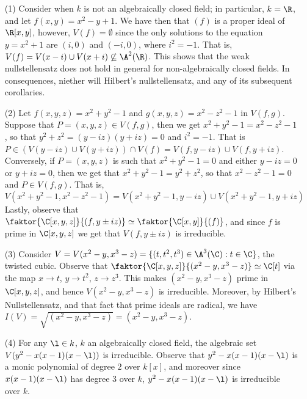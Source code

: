\begin{example}\label{example_1.6}
  \begin{enumerate}
    \item[(1)] Consider when $k$ is not an algebraically closed field; in
      particular,  $k=\R$, and let  $f(x,y)=x^2-y+1$. We have then that $(f)$ is
      a proper ideal of $\R[x,y]$, however, $V(f)=\emptyset$ since the only
      solutions to the equation $y=x^2+1$ are $(i,0)$ and $(-i,0)$, where
      $i^2=-1$. That is, $V(f)=V(x-i) \cup V(x+i) \not\subseteq \A^2(\R)$. This
      shows that  the weak nullstellensatz does not hold in general for
      non-algebraically closed fields. In consequences, niether will Hilbert's
      nullstellensatz, and any of its subsequent corollaries.

    \item[(2)] Let $f(x,y,z)=x^2+y^2-1$ and $g(x,y,z)=x^2-z^2-1$ in $V(f,g)$.
      Suppose that $P=(x,y,z) \in V(f,g)$, then we get $x^2+y^2-1=x^2-z^2-1$, so
      that  $y^2+z^2=(y-iz)(y+iz)=0$ and $i^2=-1$. That is  $P \in (V(y-iz) \cup
      V(y+iz)) \cap V(f)=V(f,y-iz) \cup V(f,y+iz)$. Conversely, if $P=(x,y,z)$
      is such that $x^2+y^2-1=0$ and either  $y-iz=0$ or $y+iz=0$, then we get
      that  $x^2+y^2-1=y^2+z^2$, so that $x^2-z^2-1=0$ and  $P \in V(f,g)$. That
      is,
      \begin{equation*}
        V(x^2+y^2-1,x^2-z^2-1)=V(x^2+y^2-1,y-iz) \cup V(x^2+y^2-1,y+iz)
      \end{equation*}
      Lastly, observe that $\faktor{\C[x,y,z]}{(f,y\pm{iz})} \simeq
      \faktor{\C[x,y]}{(f)}$, and since $f$ is prime in $\C[x,y,z]$ we get
      that $V(f,y\pm{iz})$ is irreducible.

    \item[(3)] Consider $V=V(x^2-y,x^3-z)=\{(t,t^2,t^3) \in \A^3(\C) : t \in
      \C\}$, the twisted cubic. Observe that $\faktor{\C[x,y,z]}{(x^2-y,x^3-z)}
      \simeq \C[t]$ via the map $x \xrightarrow{} t$, $y \xrightarrow{} t^2$, $z
      \xrightarrow{} z^3$. This makes $(x^2-y,x^3-z)$ prime in $\C[x,y,z]$, and
      hence $V(x^2-y,x^3-z)$ is irreducible. Moreover, by Hilbert's
      Nullstellensatz, and that fact that prime ideals are radical, we have
      $I(V)=\sqrt{(x^2-y,x^3-z)}=(x^2-y,x^3-z)$.

    \item[(4)] For any $\l \in k$, $k$ an algebraically closed field, the
      algebraic set $V(y^2-x(x-1)(x-\l))$ is irreducible. Observe that
      $y^2-x(x-1)(x-\l)$ is a monic polynomial of degree $2$ over $k[x]$, and
      moreover since $x(x-1)(x-\l)$ has degree $3$ over $k$, $y^2-x(x-1)(x-\l)$
      is irreducible over $k$.


\end{enumerate}
\end{example}
